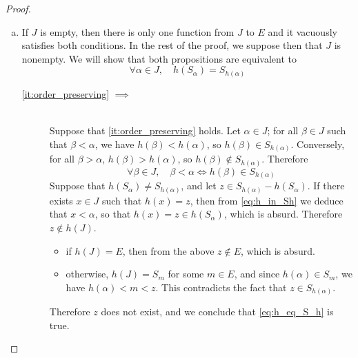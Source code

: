 \documentclass[11pt,a4paper,twoside]{article}
\makeatletter
\theoremstyle{definition}
\def\btagform@#1{\maketag@@@{\textbf{(\ignorespaces#1\unskip\@@italiccorr)}}}
\newcommand{\beqref}[1]{\textup{\btagform@{\ref{#1}}}}
\makeatother
\begin{document}
\begin{proof}\hfill

  \begin{enumerate}[(a)]

  \item
    If $J$ is empty, then there is only one function from $J$ to $E$ and it vacuously satisfies both
    conditions. In the rest of the proof, we suppose then that $J$ is nonempty. We will show that both
    propositions are equivalent to
    \begin{equation} \label{eq:h_eq_S_h}
      \forall \alpha \in J, \quad h ( S_\alpha ) = S_{ h ( \alpha ) }
    \end{equation}

    \begin{description}

    \item [\ref{it:order_preserving} $\bm{\implies}$ \beqref{eq:h_eq_S_h}]~\\
      Suppose that \ref{it:order_preserving} holds. Let $\alpha \in J$; for all $\beta \in J$
      such that $\beta < \alpha$, we have $h ( \beta ) < h ( \alpha )$, so $h ( \beta ) \in S_{ h ( \alpha ) }$.
      Conversely, for all $\beta > \alpha$, $h ( \beta ) > h ( \alpha )$, so $h ( \beta ) \notin S_{ h ( \alpha ) }$.
      Therefore
      \begin{equation} \label{eq:h_in_Sh}
        \forall \beta \in J, \quad\beta < \alpha \iff h ( \beta ) \in S_{ h ( \alpha ) }
      \end{equation}
      Suppose that $h ( S_\alpha ) \neq S_{ h ( \alpha ) }$, and let $z \in S_{ h ( \alpha ) } - h ( S_\alpha )$.
      If there exists $x \in J$ such that $h ( x ) = z$, then from \eqref{eq:h_in_Sh} we deduce that $x < \alpha$,
      so that $h ( x ) = z \in h ( S_\alpha )$, which is absurd. Therefore $z \notin h ( J )$.

      \begin{itemize}

      \item if $h ( J ) = E$, then from the above $z \notin E$, which is absurd.

      \item otherwise, $h ( J ) = S_m$ for some $m \in E$, and since $h ( \alpha ) \in S_m$,
        we have $h ( \alpha ) < m < z$. This contradicts the fact that $z \in S_{ h ( \alpha ) }$.

      \end{itemize}
      Therefore $z$ does not exist, and we conclude that \eqref{eq:h_eq_S_h} is true.


\end{description}
\end{enumerate}
\end{proof}
\end{document}
